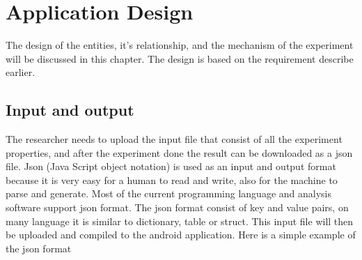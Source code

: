 \section{Application Design}
The design of the entities, it's relationship, and the mechanism of the experiment will be discussed in this chapter. The design is based on the requirement describe earlier.

\subsection{Input and output}


The researcher needs to upload the input file that consist of all the experiment properties, and after the experiment done the result can be downloaded as a json file.
Json (Java Script object notation) is used as an input and output format because it is very easy for a human to read and write, also for the machine to parse and generate. Most of the current programming language and analysis software support json format. The json format consist of key and value pairs, on many language it is similar to dictionary, table or struct. This input file will then be uploaded and compiled to the android application.
Here is a simple example of the json format


\noindent{}%

